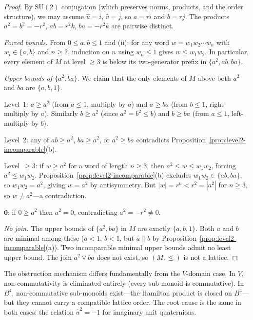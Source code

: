 \documentclass[11pt,a4paper]{article}
\newcommand{\SU}{\mathrm{SU}(2)}
\begin{document}
\begin{proof}
By $\SU$ conjugation (which preserves norms, products, and the
order structure), we may assume $\hat{u} = i$, $\hat{v} = j$,
so $a = ri$ and $b = rj$. The products $a^2 = b^2 = -r^2$,
$ab = r^2 k$, $ba = -r^2 k$ are pairwise distinct.

\emph{Forced bounds.} From $0 \leq a, b \leq 1$ and (ii):
for any word $w = w_1 w_2 \cdots w_n$ with $w_i \in \{a, b\}$ and
$n \geq 2$, induction on $n$ using $w_n \leq 1$ gives
$w \leq w_1 w_2$. In particular, every element of $M$ at level
$\geq 3$ is below its two-generator prefix in $\{a^2, ab, ba\}$.

\emph{Upper bounds of $\{a^2, ba\}$.} We claim that the only
elements of $M$ above both $a^2$ and $ba$ are $\{a, b, 1\}$.

Level~1: $a \geq a^2$ (from $a \leq 1$, multiply by $a$) and
$a \geq ba$ (from $b \leq 1$, right-multiply by $a$). Similarly
$b \geq a^2$ (since $a^2 = b^2 \leq b$) and $b \geq ba$
(from $a \leq 1$, left-multiply by $b$).

Level~2: any of $ab \geq a^2$, $ba \geq a^2$, or $a^2 \geq ba$
contradicts Proposition~\ref{prop:level2-incomparable}(b).

Level~$\geq 3$: if $w \geq a^2$ for a word of length $n \geq 3$,
then $a^2 \leq w \leq w_1 w_2$, forcing $a^2 \leq w_1 w_2$.
Proposition~\ref{prop:level2-incomparable}(b) excludes
$w_1 w_2 \in \{ab, ba\}$, so $w_1 w_2 = a^2$, giving
$w = a^2$ by antisymmetry. But $|w| = r^n < r^2 = |a^2|$ for
$n \geq 3$, so $w \neq a^2$---a contradiction.

$\mathbf{0}$: if $0 \geq a^2$ then $a^2 = 0$, contradicting
$a^2 = -r^2 \neq 0$.

\emph{No join.} The upper bounds of $\{a^2, ba\}$ in $M$ are
exactly $\{a, b, 1\}$. Both $a$ and $b$ are minimal among these
($a < 1$, $b < 1$, but $a \| b$ by
Proposition~\ref{prop:level2-incomparable}(a)). Two incomparable
minimal upper bounds admit no least upper bound. The join
$a^2 \vee ba$ does not exist, so $(M, \leq)$ is not a lattice.
\end{proof}

The obstruction mechanism differs fundamentally from the $V$-domain
case. In $V$, non-commutativity is eliminated entirely (every
sub-monoid is commutative). In $B^4$, non-commutative sub-monoids
exist---the Hamilton product is closed on $B^4$---but they cannot
carry a compatible lattice order. The root cause is the same in
both cases: the relation $\hat{u}^2 = -1$ for imaginary unit
quaternions.
\end{document}
